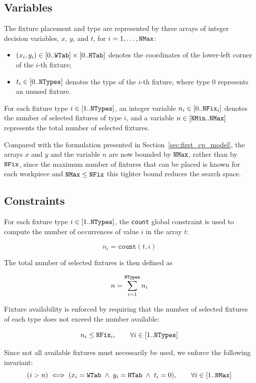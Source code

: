 \subsection{Variables}
\label{sec:second_cp_variables}

The fixture placement and type are represented by three arrays of integer decision variables, $x$, $y$, and $t$, for $i = 1,\ldots,\mathtt{NMax}$:
\begin{itemize}
	\item $ (x_i,y_i) \in [0..\mathtt{WTab}]\times [0..\mathtt{HTab}] $ denotes the coordinates of the lower-left corner of the $i$-th fixture;
	\item $ t_i \in [0..\mathtt{NTypes}] $ denotes the type of the $i$-th fixture, where type $0$ represents an unused fixture.
\end{itemize}

For each fixture type $i \in [1..\mathtt{NTypes}]$, an integer variable $n_i \in [0..\mathtt{NFix}_i]$ denotes the number of selected fixtures of type $i$, and a variable $n \in [\mathtt{NMin}..\mathtt{NMax}]$ represents the total number of selected fixtures.

Compared with the formulation presented in Section~\ref{sec:first_cp_model}, the arrays $x$ and $y$ and the variable $n$ are now bounded by $\mathtt{NMax}$, rather than by $\mathtt{NFix}$, since the maximum number of fixtures that can be placed is known for each workpiece and $\mathtt{NMax} \leq \mathtt{NFix}$ this tighter bound reduces the search space.


\subsection{Constraints}
\label{sec:second_cp_cons}

For each fixture type $i \in [1..\mathtt{NTypes}]$, the \texttt{count} global constraint is used to compute the number of occurrences of value $i$ in the array $t$:

\[
n_i = \texttt{count}(t,i)
\]

The total number of selected fixtures is then defined as

\[
n = \sum_{i=1}^{\mathtt{NTypes}} n_i
\]

Fixture availability is enforced by requiring that the number of selected fixtures of each type does not exceed the number available:

\[
n_i \leq \mathtt{NFix}_i, \qquad \forall i \in [1..\mathtt{NTypes}]
\]

Since not all available fixtures must necessarily be used, we enforce the following invariant:
\[
(i > n) \iff (x_i = \mathtt{WTab} \;\wedge\; y_i = \mathtt{HTab} \;\wedge\; t_i = 0), \qquad \forall i \in [1..\mathtt{NMax}]
\]

